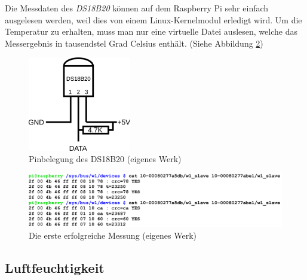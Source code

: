 Die Messdaten des \textit{DS18B20} können auf dem Raspberry Pi sehr einfach ausgelesen werden, weil dies von einem Linux-\gls{Kernelmodul} erledigt wird. Um die Temperatur zu erhalten, muss man nur eine virtuelle Datei auslesen, welche das Messergebnis in tausendstel Grad Celsius enthält. (Siehe Abbildung \ref{fig:temp_screenshot})
\begin{figure}
  \centering
     \includegraphics[width=0.4\textwidth]{figures/temp_pin.png}
  \caption{Pinbelegung des DS18B20 (eigenes Werk)}
  \label{fig:temp_pin}
\end{figure}
\begin{figure}[h]
  \centering
     \includegraphics[width=\textwidth]{figures/temp_screenshot.png}
  \caption{Die erste erfolgreiche Messung (eigenes Werk)}
  \label{fig:temp_screenshot}
\end{figure}
\subsection{Luftfeuchtigkeit}